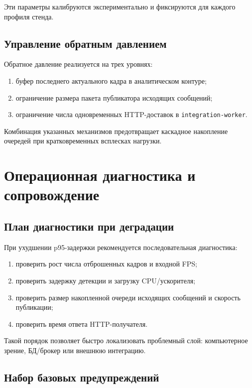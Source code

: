 Эти параметры калибруются экспериментально и фиксируются для каждого профиля стенда.

\subsection{Управление обратным давлением}

Обратное давление реализуется на трех уровнях:
\begin{enumerate}
    \item буфер последнего актуального кадра в аналитическом контуре;
    \item ограничение размера пакета публикатора исходящих сообщений;
    \item ограничение числа одновременных HTTP-доставок в \texttt{integration-worker}.
\end{enumerate}

Комбинация указанных механизмов предотвращает каскадное накопление очередей при кратковременных всплесках нагрузки.

\section{Операционная диагностика и сопровождение}

\subsection{План диагностики при деградации}

При ухудшении p95-задержки рекомендуется последовательная диагностика:
\begin{enumerate}
    \item проверить рост числа отброшенных кадров и входной FPS;
    \item проверить задержку детекции и загрузку CPU/ускорителя;
    \item проверить размер накопленной очереди исходящих сообщений и скорость публикации;
    \item проверить время ответа HTTP-получателя.
\end{enumerate}

Такой порядок позволяет быстро локализовать проблемный слой: компьютерное зрение, БД/брокер или внешнюю интеграцию.

\subsection{Набор базовых предупреждений}

